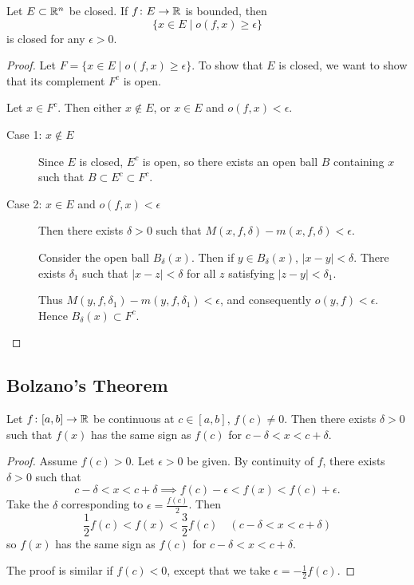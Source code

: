 \begin{lemma}
Let $E\subset\mathbb R^n$ be closed. If $f\colon E\to\mathbb R$ is bounded, then
\[\{x\in E\mid o(f,x)\ge\epsilon\}\]
is closed for any $\epsilon>0$.
\end{lemma}

\begin{proof}
Let $F=\{x\in E\mid o(f,x)\ge\epsilon\}$. To show that $E$ is closed, we want to show that its complement $F^c$ is open.

Let $x\in F^c$. Then either $x\notin E$, or $x\in E$ and $o(f,x)<\epsilon$. 
\begin{description}
\item[Case 1: $x\notin E$] 
Since $E$ is closed, $E^c$ is open, so there exists an open ball $B$ containing $x$ such that $B\subset E^c\subset F^c$.

\item[Case 2: $x\in E$ and $o(f,x)<\epsilon$] 
Then there exists $\delta>0$ such that $M(x,f,\delta)-m(x,f,\delta)<\epsilon$. 

Consider the open ball $B_\delta(x)$. Then if $y\in B_\delta(x)$, $|x-y|<\delta$. There exists $\delta_1$ such that $|x-z|<\delta$ for all $z$ satisfying $|z-y|<\delta_1$. 

Thus $M(y,f,\delta_1)-m(y,f,\delta_1)<\epsilon$, and consequently $o(y,f)<\epsilon$. Hence $B_\delta(x)\subset F^c$.
\end{description}
\end{proof}
\pagebreak

\subsection{Bolzano's Theorem}
\begin{lemma}
Let $f\colon [a,b]\to\mathbb R$ be continuous at $c\in[a,b]$, $f(c)\neq0$. Then there exists $\delta>0$ such that $f(x)$ has the same sign as $f(c)$ for $c-\delta<x<c+\delta$.
\end{lemma}

\begin{proof}
Assume $f(c)>0$. Let $\epsilon>0$ be given. By continuity of $f$, there exists $\delta>0$ such that 
\[c-\delta<x<c+\delta\implies f(c)-\epsilon<f(x)<f(c)+\epsilon.\]
Take the $\delta$ corresponding to $\epsilon=\frac{f(c)}{2}$. Then
\[\frac{1}{2}f(c)<f(x)<\frac{3}{2}f(c)\quad(c-\delta<x<c+\delta)\]
so $f(x)$ has the same sign as $f(c)$ for $c-\delta<x<c+\delta$. 

The proof is similar if $f(c)<0$, except that we take $\epsilon=-\frac{1}{2}f(c)$.
\end{proof}

